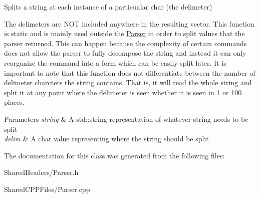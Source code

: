 Splits a string at each instance of a particualar char (the delimeter) 

The delimeters are N\+OT included anywhere in the resulting vector. This function is static and is mainly used outside the \hyperlink{classParser}{Parser} in order to split values that the parser returned. This can happen because the complexity of certain commands does not allow the parser to fully decompose the string and instead it can only reorganize the command into a form which can be easily split later. It is important to note that this function does not differentiate between the number of delimeter charcters the string contains. That is, it will read the whole string and split it at any point where the delimeter is seen whether it is seen in 1 or 100 places.


\begin{DoxyParams}{Parameters}
{\em string} & A std\+::string representation of whatever string needs to be split \\
\hline
{\em delim} & A char value representing where the string should be split \\
\hline
\end{DoxyParams}


The documentation for this class was generated from the following files\+:\begin{DoxyCompactItemize}
\item 
Shared\+Headers/Parser.\+h\item 
Shared\+C\+P\+P\+Files/Parser.\+cpp\end{DoxyCompactItemize}
